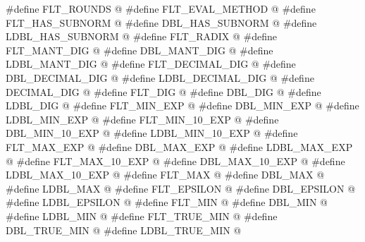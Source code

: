 %
%
%
%
%
%
%
%
%
%
%
%
%
%
%
%
%
%
%
%
%
%
%
%
%
%
%
%
%
%
%
%
%
%
%
%
%
%
%
%
\begin{codeblock}
#define FLT_ROUNDS @\seebelow@
#define FLT_EVAL_METHOD @\seebelow@
#define FLT_HAS_SUBNORM @\seebelow@
#define DBL_HAS_SUBNORM @\seebelow@
#define LDBL_HAS_SUBNORM @\seebelow@
#define FLT_RADIX @\seebelow@
#define FLT_MANT_DIG @\seebelow@
#define DBL_MANT_DIG @\seebelow@
#define LDBL_MANT_DIG @\seebelow@
#define FLT_DECIMAL_DIG @\seebelow@
#define DBL_DECIMAL_DIG @\seebelow@
#define LDBL_DECIMAL_DIG @\seebelow@
#define DECIMAL_DIG @\seebelow@
#define FLT_DIG @\seebelow@
#define DBL_DIG @\seebelow@
#define LDBL_DIG @\seebelow@
#define FLT_MIN_EXP @\seebelow@
#define DBL_MIN_EXP @\seebelow@
#define LDBL_MIN_EXP @\seebelow@
#define FLT_MIN_10_EXP @\seebelow@
#define DBL_MIN_10_EXP @\seebelow@
#define LDBL_MIN_10_EXP @\seebelow@
#define FLT_MAX_EXP @\seebelow@
#define DBL_MAX_EXP @\seebelow@
#define LDBL_MAX_EXP @\seebelow@
#define FLT_MAX_10_EXP @\seebelow@
#define DBL_MAX_10_EXP @\seebelow@
#define LDBL_MAX_10_EXP @\seebelow@
#define FLT_MAX @\seebelow@
#define DBL_MAX @\seebelow@
#define LDBL_MAX @\seebelow@
#define FLT_EPSILON @\seebelow@
#define DBL_EPSILON @\seebelow@
#define LDBL_EPSILON @\seebelow@
#define FLT_MIN @\seebelow@
#define DBL_MIN @\seebelow@
#define LDBL_MIN @\seebelow@
#define FLT_TRUE_MIN @\seebelow@
#define DBL_TRUE_MIN @\seebelow@
#define LDBL_TRUE_MIN @\seebelow@
\end{codeblock}

